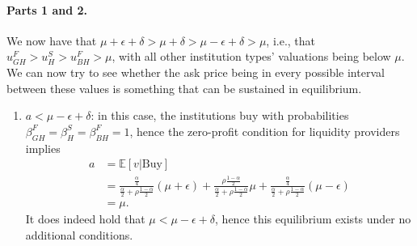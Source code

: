 \begin{solution}
	\paragraph{Parts 1 and 2.}
	We now have that $\mu + \epsilon + \delta > \mu + \delta > \mu - \epsilon + \delta > \mu$, i.e., that $u^F_{GH} > u^S_H > u^F_{BH} > \mu$, with all other institution types' valuations being below $\mu$. We can now try to see whether the ask price being in every possible interval between these values is something that can be sustained in equilibrium.
	\begin{enumerate}
		\item $a < \mu - \epsilon + \delta$: in this case, the institutions buy with probabilities $\beta^F_{GH} = \beta^S_H = \beta^F_{BH} = 1$, hence the zero-profit condition for liquidity providers implies
		\begin{align*}
			a &= \mathbb{E}[v | \text{Buy}]
			\\
			&= \frac{\frac{\alpha}{4}}{\frac{\alpha}{2} + \rho \frac{1-\alpha}{2}} (\mu + \epsilon) 
			+ \frac{\rho \frac{1-\alpha}{2}}{\frac{\alpha}{2} + \rho \frac{1-\alpha}{2}} \mu 
			+ \frac{\frac{\alpha}{4}}{\frac{\alpha}{2} + \rho \frac{1-\alpha}{2}} (\mu - \epsilon)
			\\
			&= \mu.
		\end{align*}
		It does indeed hold that $\mu < \mu - \epsilon + \delta$, hence this equilibrium exists under no additional conditions.
		

\end{enumerate}
\end{solution}
